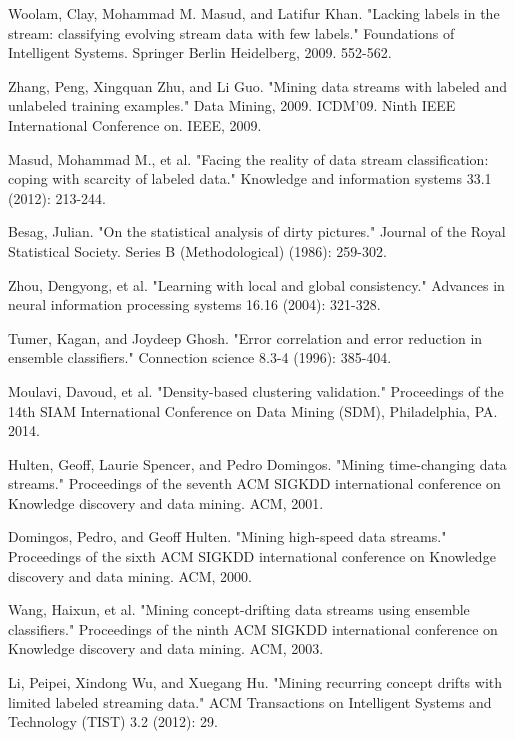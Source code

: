 \documentclass[12pt,a4paper,oneside]{report}
\begin{document}
\begin{thebibliography}{20}

Woolam, Clay, Mohammad M. Masud, and Latifur Khan. "Lacking labels in the stream: classifying evolving stream data with few labels." Foundations of Intelligent Systems. Springer Berlin Heidelberg, 2009. 552-562.

Zhang, Peng, Xingquan Zhu, and Li Guo. "Mining data streams with labeled and unlabeled training examples." Data Mining, 2009. ICDM'09. Ninth IEEE International Conference on. IEEE, 2009.

Masud, Mohammad M., et al. "Facing the reality of data stream classification: coping with scarcity of labeled data." Knowledge and information systems 33.1 (2012): 213-244.

Besag, Julian. "On the statistical analysis of dirty pictures." Journal of the Royal Statistical Society. Series B (Methodological) (1986): 259-302.

Zhou, Dengyong, et al. "Learning with local and global consistency." Advances in neural information processing systems 16.16 (2004): 321-328.

Tumer, Kagan, and Joydeep Ghosh. "Error correlation and error reduction in ensemble classifiers." Connection science 8.3-4 (1996): 385-404.

Moulavi, Davoud, et al. "Density-based clustering validation." Proceedings of the 14th SIAM International Conference on Data Mining (SDM), Philadelphia, PA. 2014.

Hulten, Geoff, Laurie Spencer, and Pedro Domingos. "Mining time-changing data streams." Proceedings of the seventh ACM SIGKDD international conference on Knowledge discovery and data mining. ACM, 2001.

Domingos, Pedro, and Geoff Hulten. "Mining high-speed data streams." Proceedings of the sixth ACM SIGKDD international conference on Knowledge discovery and data mining. ACM, 2000.

Wang, Haixun, et al. "Mining concept-drifting data streams using ensemble classifiers." Proceedings of the ninth ACM SIGKDD international conference on Knowledge discovery and data mining. ACM, 2003.

Li, Peipei, Xindong Wu, and Xuegang Hu. "Mining recurring concept drifts with limited labeled streaming data." ACM Transactions on Intelligent Systems and Technology (TIST) 3.2 (2012): 29.


\end{thebibliography}
\end{document}
